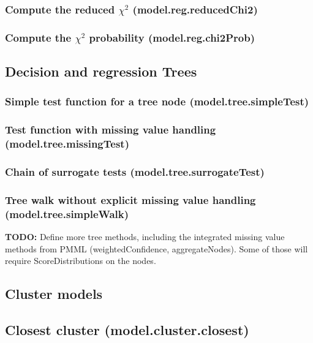 \documentclass{article}
\theoremstyle{definition}
\begin{document}
\subsubsection{Compute the reduced $\chi^2$ (model.reg.reducedChi2)}

\subsubsection{Compute the $\chi^2$ probability (model.reg.chi2Prob)}

\subsection{Decision and regression Trees}

\subsubsection{Simple test function for a tree node (model.tree.simpleTest)}

\subsubsection{Test function with missing value handling (model.tree.missingTest)}

\subsubsection{Chain of surrogate tests (model.tree.surrogateTest)}

\subsubsection{Tree walk without explicit missing value handling (model.tree.simpleWalk)}

{\bf TODO:} Define more tree methods, including the integrated missing value methods from PMML (weightedConfidence, aggregateNodes).  Some of those will require ScoreDistributions on the nodes.

\subsection{Cluster models}

\subsection{Closest cluster (model.cluster.closest)}
\end{document}
